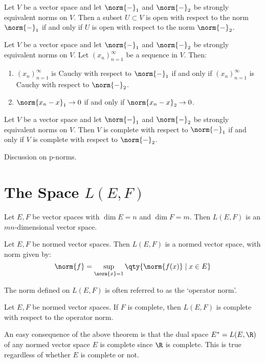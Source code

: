 \begin{proposition}
   Let \( V \) be a vector space and let \( \norm{-}_1 \) and \( \norm{-}_2 \) be strongly equivalent norms on \( V \). Then a subset \( U\subset V \) is open with respect to the norm \( \norm{-}_1 \) if and only if \( U \) is open with respect to the norm \( \norm{-}_2 \).
 \end{proposition}
 
 \begin{proposition}
   Let \( V \) be a vector space and let \( \norm{-}_1 \) and \( \norm{-}_2 \) be strongly equivalent norms on \( V \). Let \( (x_n)_{n=1}^\infty \) be a sequence in \( V \). Then:
   \begin{enumerate}[label=(\alph*)]
   \item \( (x_n)_{n=1}^\infty \) is Cauchy with respect to \( \norm{-}_1 \) if and only if \( (x_n)_{n=1}^\infty \) is Cauchy with respect to \( \norm{-}_2 \).
   \item \( \norm{x_n-x}_1\to 0 \) if and only if \( \norm{x_n-x}_2\to 0 \).
   \end{enumerate}
 \end{proposition}

 \begin{proposition}
   Let \( V \) be a vector space and let \( \norm{-}_1 \) and \( \norm{-}_2 \) be strongly equivalent norms on \( V \). Then \( V \) is complete with respect to \( \norm{-}_1 \) if and only if \( V \) is complete with respect to \( \norm{-}_2 \).
 \end{proposition}

 Discussion on p-norms.
 
 \section{The Space \( L(E,F) \)}
 \begin{theorem}
   Let \( E,F \) be vector spaces with \( \dim E=n \) and \( \dim F=m \). Then \( L(E,F) \) is an \( mn \)-dimensional vector space.
 \end{theorem}

 \begin{theorem}
   Let \( E,F \) be normed vector spaces. Then \( L(E,F) \) is a normed vector space, with norm given by:
   \[ \norm{f}=\sup_{\norm{x}=1}\qty{\norm{f(x)}\mid x\in E} \]
 \end{theorem}

 The norm defined on \( L(E,F) \) is often referred to as the `operator norm'.

 \begin{theorem}
   Let \( E,F \) be normed vector spaces. If \( F \) is complete, then \( L(E,F) \) is complete with respect to the operator norm.
 \end{theorem}

 An easy consequence of the above theorem is that the dual space \( E^*=L(E,\R) \) of any normed vector space \( E \) is complete since \( \R \) is complete. This is true regardless of whether \( E \) is complete or not.

